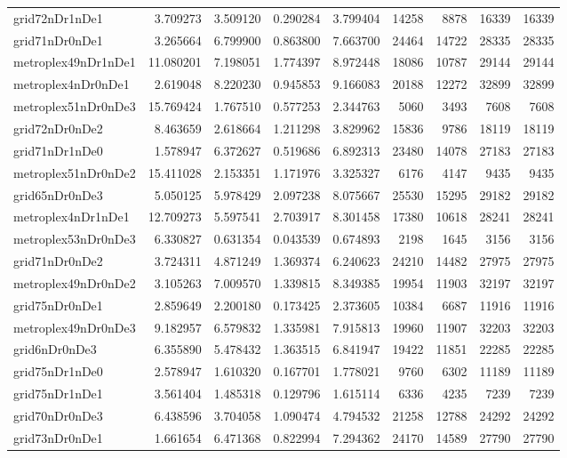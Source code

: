 \begin{longtable}{|l|r|r|r|r|r|r|r|r|}
grid72nDr1nDe1 & 3.709273 & 3.509120 & 0.290284 & 3.799404 & 14258 & 8878 & 16339 & 16339 \\
grid71nDr0nDe1 & 3.265664 & 6.799900 & 0.863800 & 7.663700 & 24464 & 14722 & 28335 & 28335 \\
metroplex49nDr1nDe1 & 11.080201 & 7.198051 & 1.774397 & 8.972448 & 18086 & 10787 & 29144 & 29144 \\
metroplex4nDr0nDe1 & 2.619048 & 8.220230 & 0.945853 & 9.166083 & 20188 & 12272 & 32899 & 32899 \\
metroplex51nDr0nDe3 & 15.769424 & 1.767510 & 0.577253 & 2.344763 & 5060 & 3493 & 7608 & 7608 \\
grid72nDr0nDe2 & 8.463659 & 2.618664 & 1.211298 & 3.829962 & 15836 & 9786 & 18119 & 18119 \\
grid71nDr1nDe0 & 1.578947 & 6.372627 & 0.519686 & 6.892313 & 23480 & 14078 & 27183 & 27183 \\
metroplex51nDr0nDe2 & 15.411028 & 2.153351 & 1.171976 & 3.325327 & 6176 & 4147 & 9435 & 9435 \\
grid65nDr0nDe3 & 5.050125 & 5.978429 & 2.097238 & 8.075667 & 25530 & 15295 & 29182 & 29182 \\
metroplex4nDr1nDe1 & 12.709273 & 5.597541 & 2.703917 & 8.301458 & 17380 & 10618 & 28241 & 28241 \\
metroplex53nDr0nDe3 & 6.330827 & 0.631354 & 0.043539 & 0.674893 & 2198 & 1645 & 3156 & 3156 \\
grid71nDr0nDe2 & 3.724311 & 4.871249 & 1.369374 & 6.240623 & 24210 & 14482 & 27975 & 27975 \\
metroplex49nDr0nDe2 & 3.105263 & 7.009570 & 1.339815 & 8.349385 & 19954 & 11903 & 32197 & 32197 \\
grid75nDr0nDe1 & 2.859649 & 2.200180 & 0.173425 & 2.373605 & 10384 & 6687 & 11916 & 11916 \\
metroplex49nDr0nDe3 & 9.182957 & 6.579832 & 1.335981 & 7.915813 & 19960 & 11907 & 32203 & 32203 \\
grid6nDr0nDe3 & 6.355890 & 5.478432 & 1.363515 & 6.841947 & 19422 & 11851 & 22285 & 22285 \\
grid75nDr1nDe0 & 2.578947 & 1.610320 & 0.167701 & 1.778021 & 9760 & 6302 & 11189 & 11189 \\
grid75nDr1nDe1 & 3.561404 & 1.485318 & 0.129796 & 1.615114 & 6336 & 4235 & 7239 & 7239 \\
grid70nDr0nDe3 & 6.438596 & 3.704058 & 1.090474 & 4.794532 & 21258 & 12788 & 24292 & 24292 \\
grid73nDr0nDe1 & 1.661654 & 6.471368 & 0.822994 & 7.294362 & 24170 & 14589 & 27790 & 27790 \\

\end{longtable}
